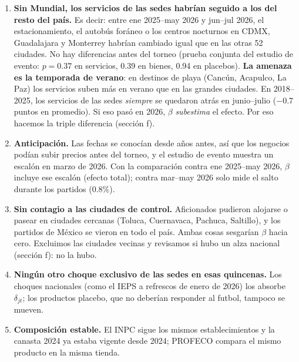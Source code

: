 \documentclass[11pt,letterpaper]{article}
\newcommand{\seccion}[1]{\vspace{4pt}{\large\bfseries #1}\par\vspace{1pt}}
\begin{document}
\seccion{(e) Supuestos, en este contexto}
\begin{enumerate}
\item \textbf{Sin Mundial, los servicios de las sedes habrían seguido a los del resto del país.}
  Es decir: entre ene 2025--may 2026 y jun--jul 2026, el estacionamiento, el autobús foráneo o los
  centros nocturnos en CDMX, Guadalajara y Monterrey habrían cambiado igual que en las otras 52
  ciudades. No hay diferencias antes del torneo (prueba conjunta del estudio de evento: $p=0.37$
  en servicios, 0.39 en bienes, 0.94 en placebos). \textbf{La amenaza es la temporada de verano}:
  en destinos de playa (Cancún, Acapulco, La Paz) los servicios suben más en verano que en las
  grandes ciudades. En 2018--2025, los servicios de las sedes \emph{siempre} se quedaron atrás en
  junio--julio ($-0.7$ puntos en promedio). Si eso pasó en 2026, $\beta$ \emph{subestima} el
  efecto. Por eso hacemos la triple diferencia (sección f).
\item \textbf{Anticipación.} Las fechas se conocían desde años antes, así que los negocios podían
  subir precios antes del torneo, y el estudio de evento muestra un escalón en marzo de 2026. Con
  la comparación contra ene 2025--may 2026, $\beta$ incluye ese escalón (efecto total); contra
  mar--may 2026 solo mide el salto durante los partidos (0.8\%).
\item \textbf{Sin contagio a las ciudades de control.} Aficionados pudieron alojarse o pasear en
  ciudades cercanas (Toluca, Cuernavaca, Pachuca, Saltillo), y los partidos de México se vieron en
  todo el país. Ambas cosas sesgarían $\beta$ hacia cero. Excluimos las ciudades vecinas y
  revisamos si hubo un alza nacional (sección f): no la hubo.
\item \textbf{Ningún otro choque exclusivo de las sedes en esas quincenas.} Los choques nacionales
  (como el IEPS a refrescos de enero de 2026) los absorbe $\delta_{jt}$; los productos placebo, que
  no deberían responder al futbol, tampoco se mueven.
\item \textbf{Composición estable.} El INPC sigue los mismos establecimientos y la canasta 2024 ya
  estaba vigente desde 2024; PROFECO compara el mismo producto en la misma tienda.
\end{enumerate}
\end{document}
